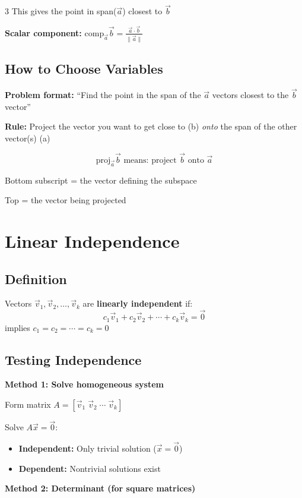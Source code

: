 \documentclass[10pt,landscape]{article}
\begin{document}
\begin{multicols*}{3}
This gives the point in span($\vec{a}$) closest to $\vec{b}$

\textbf{Scalar component:} $\text{comp}_{\vec{a}}\vec{b} = \frac{\vec{a} \cdot \vec{b}}{\|\vec{a}\|}$

\subsection*{How to Choose Variables}
\textbf{Problem format:} ``Find the point in the span of the $\vec{a}$ vectors closest to the $\vec{b}$ vector''

\textbf{Rule:} Project the vector you want to get close to (b) \textit{onto} the span of the other vector(s) (a)

$$\text{proj}_{\vec{a}}\vec{b} \text{ means: project } \vec{b} \text{ onto } \vec{a}$$

Bottom subscript = the vector defining the subspace

Top = the vector being projected

\section*{Linear Independence}

\subsection*{Definition}
Vectors $\vec{v}_1, \vec{v}_2, \ldots, \vec{v}_k$ are \textbf{linearly independent} if:
$$c_1\vec{v}_1 + c_2\vec{v}_2 + \cdots + c_k\vec{v}_k = \vec{0}$$
implies $c_1 = c_2 = \cdots = c_k = 0$

\subsection*{Testing Independence}

\textbf{Method 1: Solve homogeneous system}

Form matrix $A = [\vec{v}_1 \; \vec{v}_2 \; \cdots \; \vec{v}_k]$

Solve $A\vec{x} = \vec{0}$:
\begin{itemize}
    \item \textbf{Independent:} Only trivial solution ($\vec{x} = \vec{0}$)
    \item \textbf{Dependent:} Nontrivial solutions exist
\end{itemize}

\textbf{Method 2: Determinant (for square matrices)}


\end{multicols*}
\end{document}
